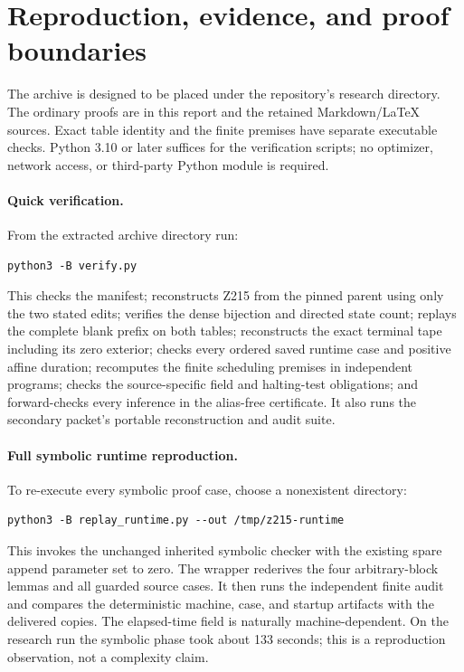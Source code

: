 \documentclass[11pt,letterpaper]{article}
\theoremstyle{definition}
\begin{document}




\section{Reproduction, evidence, and proof boundaries}
\label{sec:reproduce}

The archive is designed to be placed under the repository's research
directory.  The ordinary proofs are in this report and the retained
Markdown/LaTeX sources.  Exact table identity and the finite premises
have separate executable checks.  Python 3.10 or later suffices for the
verification scripts; no optimizer, network access, or third-party
Python module is required.

\paragraph{Quick verification.}
From the extracted archive directory run:
\begin{verbatim}
python3 -B verify.py
\end{verbatim}
This checks the manifest; reconstructs Z215 from the pinned parent
using only the two stated edits; verifies the dense bijection and
directed state count; replays the complete blank prefix on both tables;
reconstructs the exact terminal tape including its zero exterior;
checks every ordered saved runtime case and positive affine duration;
recomputes the finite scheduling premises in independent programs;
checks the source-specific field and halting-test obligations; and
forward-checks every inference in the alias-free certificate.  It also
runs the secondary packet's portable reconstruction and audit suite.

\paragraph{Full symbolic runtime reproduction.}
To re-execute every symbolic proof case, choose a nonexistent directory:
\begin{verbatim}
python3 -B replay_runtime.py --out /tmp/z215-runtime
\end{verbatim}
This invokes the unchanged inherited symbolic checker with the
existing spare append parameter set to zero.  The wrapper rederives the
four arbitrary-block lemmas and all guarded source cases.  It then
runs the independent finite audit and compares the deterministic
machine, case, and startup artifacts with the delivered copies.
The elapsed-time field is naturally machine-dependent.  On the
research run the symbolic phase took about 133 seconds; this is a
reproduction observation, not a complexity claim.
\end{document}
